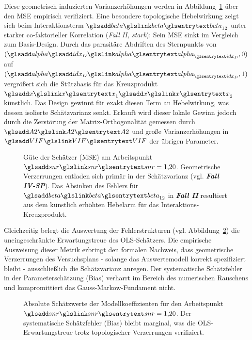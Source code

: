 

Diese geometrisch induzierten Varianzerhöhungen werden in Abbildung~\ref{fig:ma_abb5.1.4_msedev} über den \ac{MSE} empirisch verifiziert.
Eine besondere topologische Hebelwirkung zeigt sich beim Interaktionsterm $\sym{beta}_{12}$ unter starker co-faktorieller Korrelation (\textit{Fall II, stark}): Sein \ac{MSE} sinkt im Vergleich zum Basis-Design.
Durch das parasitäre Abdriften des Sternpunkts von $(\symsub{alpha}{idx_D}, 0)$ auf $(\symsub{alpha}{idx_D}, 1)$ vergrößert sich die Stützbasis für das Kreuzprodukt $\sym{x}_1\sym{x}_2$ künstlich.
Das Design gewinnt für exakt diesen Term an Hebelwirkung, was dessen isolierte Schätzvarianz senkt.
Erkauft wird dieser lokale Gewinn jedoch durch die Zerstörung der Matrix-Orthogonalität gemessen durch $\sym{A2}$ und große Varianzerhöhungen in $\sym{VIF}$ der übrigen Parameter.

\begin{figure}[htbp]
    \centering
    \setlength{}
    \setlength\figureheight{6cm}
    
    \caption{Güte der Schätzer (\ac{MSE}) am Arbeitspunkt $\sym{snr}=1{,}20$. Geometrische Verzerrungen entladen sich primär in der Schätzvarianz (vgl. \textbf{\textit{Fall IV-\ac{SP}}}). Das Absinken des Fehlers für $\sym{beta}_{12}$ in \textbf{\textit{Fall II}} resultiert aus dem künstlich erhöhten Hebelarm für das Interaktions-Kreuzprodukt.}
    \label{fig:ma_abb5.1.4_msedev}
\end{figure}

Gleichzeitig belegt die Auswertung der Fehlerstrukturen (vgl. Abbildung~\ref{fig:ma_abb5.1.4_betadev}) die uneingeschränkte Erwartungstreue des \ac{OLS}-Schätzers.
Die empirische Ausweisung dieser Metrik erbringt den formalen Nachweis, dass geometrische Verzerrungen des Versuchsplans - solange das Auswertemodell korrekt spezifiziert bleibt - ausschließlich die Schätzvarianz anregen.
Der systematische Schätzfehler in der Parameterschätzung (Bias) verharrt im Bereich des numerischen Rauschens und kompromittiert das Gauss-Markow-Fundament nicht.


\begin{figure}[htbp]
    \centering
    \setlength{}
    \setlength\figureheight{6cm}
    
    \caption{Absolute Schätzwerte der Modellkoeffizienten für den Arbeitspunkt $\sym{snr}=1{,}20$. Der systematische Schätzfehler (Bias) bleibt marginal, was die \ac{OLS}-Erwartungstreue trotz topologischer Verzerrungen verifiziert.}
    \label{fig:ma_abb5.1.4_betadev}
\end{figure}

